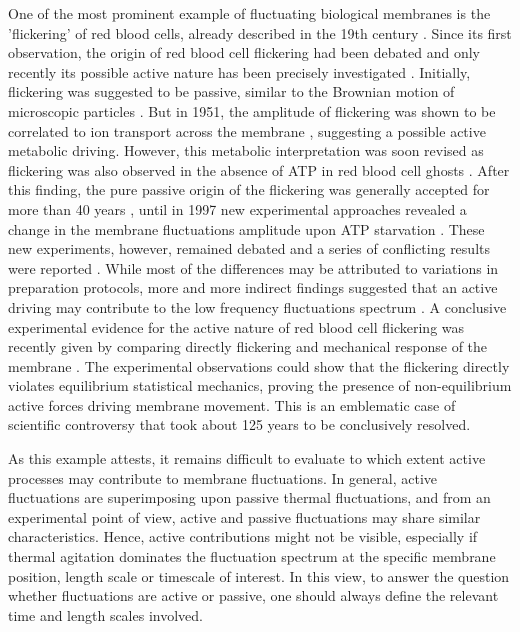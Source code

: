 \documentclass[graybox]{svmult}
\begin{document}
One of the most prominent example of fluctuating biological membranes is the 'flickering' of red blood cells, already described in the 19th century \cite{Browicz:1890}. Since its first observation, the origin of red blood cell flickering had been debated and only recently its possible active nature has been precisely investigated \cite{Tuvia:1997, Park:2010, Betz:2009, Turlier:2016}. Initially, flickering was suggested to be passive, similar to the Brownian motion of microscopic particles  \cite{Cabot_1901, Pulvertaft_1949}. But in 1951, the amplitude of flickering was shown to be correlated to ion transport across the membrane \cite{Blowers:1951}, suggesting a possible active metabolic driving. However, this metabolic interpretation was soon revised as flickering was also observed in the absence of ATP in red blood cell ghosts \cite{Parpart:1956}. After this finding, the pure passive origin of the flickering was generally accepted for more than 40 years \cite{Brochard:1975}, until in 1997 new experimental approaches revealed a change in the membrane fluctuations amplitude upon ATP starvation \cite{Tuvia:1997}. These new experiments, however, remained debated and a series of conflicting results were reported \cite{Evans:2008}. While most of the differences may be attributed  to variations in preparation protocols, more and more indirect findings suggested that an active driving may contribute to the low frequency fluctuations spectrum \cite{Park:2010, Rodriguez:2015}. A conclusive experimental evidence for the active nature of red blood cell flickering was recently given by comparing directly flickering and mechanical response of the membrane \cite{Turlier:2016}. The experimental observations could show that the flickering directly violates equilibrium statistical mechanics,
proving the presence of non-equilibrium active forces driving membrane movement. This is an emblematic case of scientific controversy that took about 125 years to be conclusively resolved. 

As this example attests, it remains difficult to evaluate to which extent active processes may contribute to membrane fluctuations. In general, active fluctuations are superimposing upon passive thermal fluctuations, and from an experimental point of view, active and passive fluctuations may share similar characteristics. Hence, active contributions might not be visible, especially if thermal agitation dominates the fluctuation spectrum at the specific membrane position, length scale or timescale of interest. In this view, to answer the question whether fluctuations are active or passive, one should always define the relevant time and length scales involved.    
\end{document}
